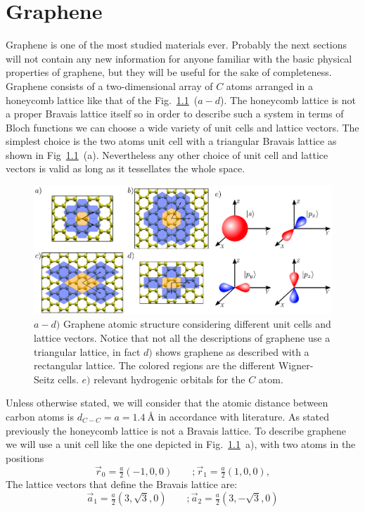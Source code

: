 \chapter{Graphene}
\label{ch:graphene}
Graphene is one of the most studied materials ever\cite{Murakami2009, CastroNeto2009a, Mas-Balleste2011, Rozhkov2016, Han2014}. Probably the next sections will not contain any new information for anyone familiar with the basic physical properties of graphene, but they will be useful for the sake of completeness.  %
Graphene consists of a two-dimensional array of $C$ atoms arranged in a honeycomb lattice like that of the Fig.~\ref{graphene_structure}~($a-d$). The honeycomb lattice is not a proper Bravais lattice itself so in order to describe such a system in terms of Bloch functions we can choose a wide variety of unit cells and lattice vectors. The simplest choice is the two atoms unit cell with a triangular Bravais lattice as shown in Fig~\ref{graphene_structure}~(a). Nevertheless any other choice of unit cell and lattice vectors is valid as long as it tessellates the whole space.
\begin{figure}[h!]
\centering
\includegraphics[width=\textwidth]{chapter04/figures/graphene.pdf}
\vspace{-5pt}
\caption{$a-d)$ Graphene atomic structure considering different unit cells and lattice vectors. Notice that not all the descriptions of graphene use a triangular lattice, in fact $d)$ shows graphene as described with a rectangular lattice. The colored regions are the different Wigner-Seitz cells. $e)$ relevant hydrogenic orbitals for the $C$ atom.}
\label{graphene_structure}
\end{figure}
\FloatBarrier
Unless otherwise stated, we will consider that the atomic distance between carbon atoms is $d_{C-C}=a=\SI{1.4}{\angstrom}$ in accordance with literature\cite{KatsnelsonBook, Cooper2012}. %
As stated previously the honeycomb lattice is not a Bravais lattice. To describe graphene we will use a unit cell like the one depicted in Fig.~\ref{graphene_structure}~a), with two atoms in the positions
\begin{equation}
\vec{r}_0 = \tfrac{a}{2}(-1,0,0) \qquad;
\vec{r}_1 = \tfrac{a}{2}(1,0,0),
\label{at_pos}
\end{equation}
The lattice vectors that define the Bravais lattice are:
\begin{equation}
\vec{a}_1 = \tfrac{a}{2}\left(3,\sqrt{3},0\right) \qquad;
\vec{a}_2 = \tfrac{a}{2}\left(3,-\sqrt{3},0\right)
\label{latt_vec}
\end{equation}

